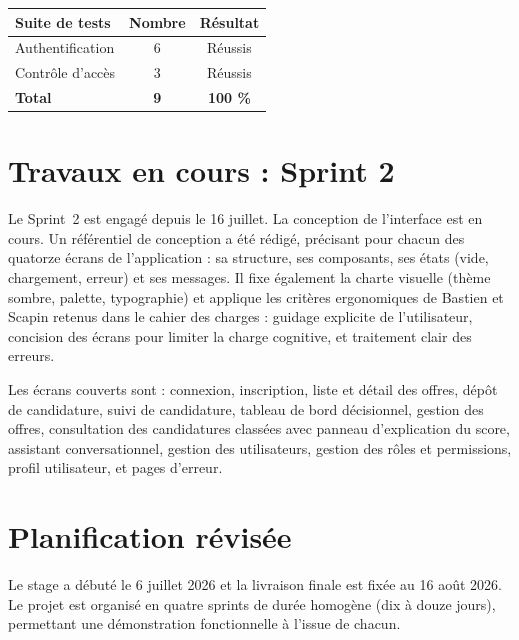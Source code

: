 \documentclass[11pt,a4paper]{article}
\begin{document}
\begin{center}
\begin{tabular}{lcc}
  \toprule
  \textbf{Suite de tests} & \textbf{Nombre} & \textbf{Résultat} \\
  \midrule
  Authentification & 6 & \textcolor{vert}{Réussis} \\
  Contrôle d'accès & 3 & \textcolor{vert}{Réussis} \\
  \midrule
  \textbf{Total} & \textbf{9} & \textcolor{vert}{\textbf{100 \%}} \\
  \bottomrule
\end{tabular}
\end{center}

\section{Travaux en cours : Sprint 2}
Le Sprint~2 est engagé depuis le 16 juillet. La conception de l'interface est en cours. Un référentiel de conception a été rédigé, précisant pour chacun des quatorze écrans de l'application : sa structure, ses composants, ses états (vide, chargement, erreur) et ses messages. Il fixe également la charte visuelle (thème sombre, palette, typographie) et applique les critères ergonomiques de Bastien et Scapin retenus dans le cahier des charges : guidage explicite de l'utilisateur, concision des écrans pour limiter la charge cognitive, et traitement clair des erreurs.

Les écrans couverts sont : connexion, inscription, liste et détail des offres, dépôt de candidature, suivi de candidature, tableau de bord décisionnel, gestion des offres, consultation des candidatures classées avec panneau d'explication du score, assistant conversationnel, gestion des utilisateurs, gestion des rôles et permissions, profil utilisateur, et pages d'erreur.

\section{Planification révisée}
Le stage a débuté le 6 juillet 2026 et la livraison finale est fixée au 16 août 2026. Le projet est organisé en quatre sprints de durée homogène (dix à douze jours), permettant une démonstration fonctionnelle à l'issue de chacun.
\end{document}

